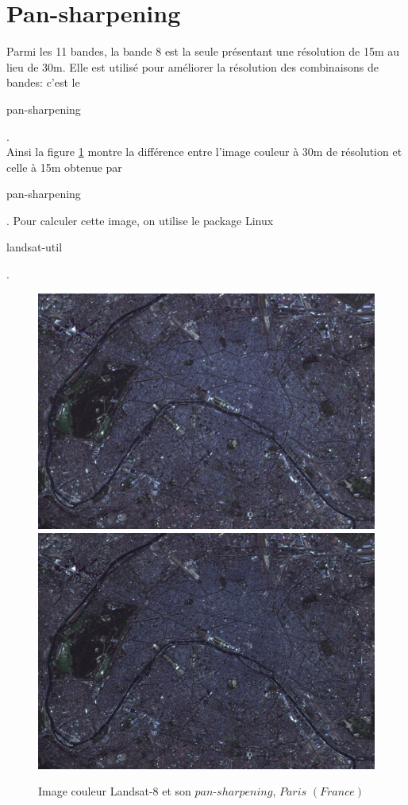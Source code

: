 \documentclass{book}
\begin{document}
\clearpage

\section{Pan-sharpening}

Parmi les 11 bandes, la bande 8 est la seule présentant une résolution de 15m au lieu de 30m. Elle est utilisé pour améliorer la résolution
des combinaisons de bandes: c'est le \begin{itshape}pan-sharpening\end{itshape}.\\
Ainsi la figure \ref{pan_sharpen} montre la différence entre l'image couleur à 30m de résolution et celle à 15m obtenue par \begin{itshape}pan-sharpening\end{itshape}.
Pour calculer cette image, on utilise le package Linux \begin{itshape}landsat-util\end{itshape} \cite{dans-gdal}.

\begin{figure}[H]
\begin{center}
\includegraphics[scale=0.4]{images/paris_rgb_zoom.png}
\includegraphics[scale=0.2]{images/paris_rgb_zoom_pansharpened.png}
\end{center}
\caption{Image couleur Landsat-8 et son $pan$-$sharpening$, $Paris$ $(France)$}
\label{pan_sharpen}
\end{figure}
\end{document}
